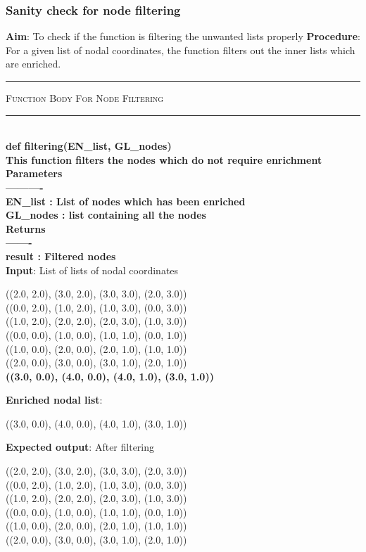 \documentclass[fleqn, 12.5pt,a4paper]{report}
\begin{document}
\subsubsection{Sanity check for node filtering}
\textbf{Aim}: To check if the function is filtering the unwanted lists properly \newline
\textbf{Procedure}: For a given list of nodal coordinates, the function filters out the inner lists which are enriched.
\\
{ \rule{\linewidth}{0.05cm}}
	{\scshape Function Body For Node Filtering}\\
{ \rule{\linewidth}{0.05cm}}
{\selectfont
\\
\textbf{def filtering(EN{\_}list, GL{\_}nodes)\\
    This function filters the nodes which do not require enrichment\\
    Parameters\\
    ----------\\
    EN{\_}list : List of nodes which has been enriched\\
    GL{\_}nodes : list containing all the nodes\\
    Returns\\
    -------\\
    result : Filtered nodes\\
    }}
\textbf{Input}: List of lists of nodal coordinates
\begin{center}
((2.0, 2.0), (3.0, 2.0), (3.0, 3.0), (2.0, 3.0))\\
((0.0, 2.0), (1.0, 2.0), (1.0, 3.0), (0.0, 3.0))\\
((1.0, 2.0), (2.0, 2.0), (2.0, 3.0), (1.0, 3.0))\\
((0.0, 0.0), (1.0, 0.0), (1.0, 1.0), (0.0, 1.0))\\
((1.0, 0.0), (2.0, 0.0), (2.0, 1.0), (1.0, 1.0))\\
((2.0, 0.0), (3.0, 0.0), (3.0, 1.0), (2.0, 1.0))\\
\textbf{((3.0, 0.0), (4.0, 0.0), (4.0, 1.0), (3.0, 1.0))}\\
\end{center}
\textbf{Enriched nodal list}:
\begin{center}
((3.0, 0.0), (4.0, 0.0), (4.0, 1.0), (3.0, 1.0))
\end{center}
\newline
\textbf{Expected output}: After filtering
\begin{center}
((2.0, 2.0), (3.0, 2.0), (3.0, 3.0), (2.0, 3.0))\\
((0.0, 2.0), (1.0, 2.0), (1.0, 3.0), (0.0, 3.0))\\
((1.0, 2.0), (2.0, 2.0), (2.0, 3.0), (1.0, 3.0))\\
((0.0, 0.0), (1.0, 0.0), (1.0, 1.0), (0.0, 1.0))\\
((1.0, 0.0), (2.0, 0.0), (2.0, 1.0), (1.0, 1.0))\\
((2.0, 0.0), (3.0, 0.0), (3.0, 1.0), (2.0, 1.0))\\
\end{center}
\end{document}
